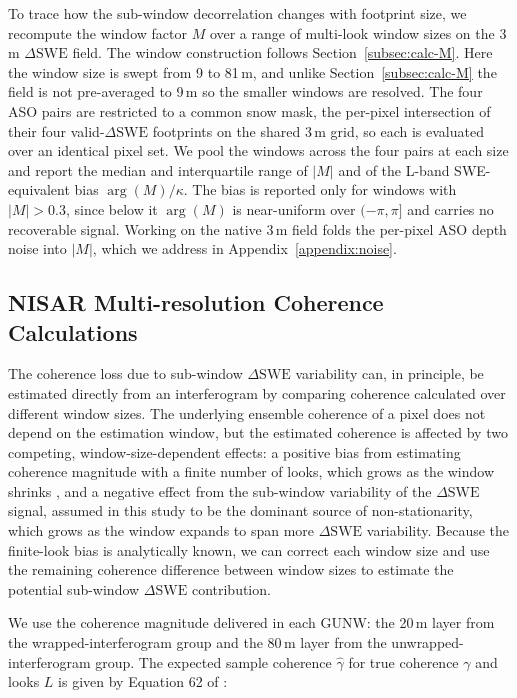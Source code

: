 \documentclass[tc, manuscript]{copernicus}
\begin{document}
To trace how the sub-window decorrelation changes with footprint size, we recompute the window factor $M$ over a range of multi-look window sizes on the 3\,\unit{m} $\Delta\mathrm{SWE}$ field. The window construction follows Section~\ref{subsec:calc-M}. Here the window size is swept from 9 to 81\,\unit{m}, and unlike Section~\ref{subsec:calc-M} the field is not pre-averaged to 9\,\unit{m} so the smaller windows are resolved. The four ASO pairs are restricted to a common snow mask, the per-pixel intersection of their four valid-$\Delta\mathrm{SWE}$ footprints on the shared 3\,\unit{m} grid, so each is evaluated over an identical pixel set. We pool the windows across the four pairs at each size and report the median and interquartile range of $|M|$ and of the L-band SWE-equivalent bias $\arg(M)/\kappa$. The bias is reported only for windows with $|M|>0.3$, since below it $\arg(M)$ is near-uniform over $(-\pi,\pi]$ and carries no recoverable signal. Working on the native 3\,\unit{m} field folds the per-pixel ASO depth noise into $|M|$, which we address in Appendix~\ref{appendix:noise}.

\subsection{NISAR Multi-resolution Coherence Calculations}\label{subsec:nisar-coherence-calc}

The coherence loss due to sub-window $\Delta\mathrm{SWE}$ variability can, in principle, be estimated directly from an interferogram by comparing coherence calculated over different window sizes. The underlying ensemble coherence of a pixel does not depend on the estimation window, but the estimated coherence is affected by two competing, window-size-dependent effects: a positive bias from estimating coherence magnitude with a finite number of looks, which grows as the window shrinks \citep{Bamler1998}, and a negative effect from the sub-window variability of the $\Delta\mathrm{SWE}$ signal, assumed in this study to be the dominant source of non-stationarity, which grows as the window expands to span more $\Delta\mathrm{SWE}$ variability. Because the finite-look bias is analytically known, we can correct each window size and use the remaining coherence difference between window sizes to estimate the potential sub-window $\Delta\mathrm{SWE}$ contribution.

We use the coherence magnitude delivered in each GUNW: the 20\,\unit{m} layer from the wrapped-interferogram group and the 80\,\unit{m} layer from the unwrapped-interferogram group. The expected sample coherence $\hat{\gamma}$ for true coherence $\gamma$ and looks $L$ is given by Equation 62 of \citet{Bamler1998}:
\end{document}
